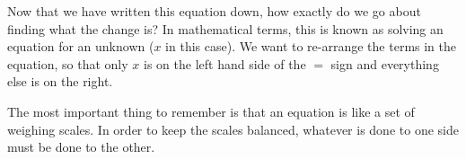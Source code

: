       \label{m38346*id176098}Now that we have written this equation down, how exactly do we go about finding
what the change is? In mathematical terms, this is known as solving an equation
for an unknown ($x$ in this case). We want to re-arrange the terms in the
equation, so that only $x$ is on the left hand side of the $=$ sign and
everything else is on the right.\par 
      \label{m38346*id176132}The most important thing to remember is that an equation is like a set of
weighing scales. In order to keep the scales balanced, whatever is done to one
side must be done to the other.\par 
    \setcounter{subfigure}{0}
